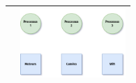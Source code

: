 \documentclass[12pt,a4paper,article,english,firamath]{nsi}
\newcommand{\truc}{4cm}
\begin{document}
\begin{center}
\begin{tabular}{|c|c|}
        \hline
                                                                      & \includegraphics[width=\truc]{img/d6.png}                     \\
        \hline
    \end{tabular}\\
    

\end{center}
\end{document}
